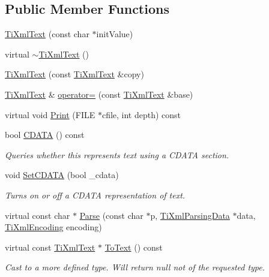 \subsection*{Public Member Functions}
\begin{DoxyCompactItemize}
\item 
\hyperlink{class_ti_xml_text_af659e77c6b87d684827f35a8f4895960}{Ti\+Xml\+Text} (const char $\ast$init\+Value)
\item 
virtual \hyperlink{class_ti_xml_text_a829a4bd2d8d2461c333eb4f3f5b1b3d2}{$\sim$\+Ti\+Xml\+Text} ()
\item 
\hyperlink{class_ti_xml_text_a8d2cc1b4af2208cbb0171cf20f6815d1}{Ti\+Xml\+Text} (const \hyperlink{class_ti_xml_text}{Ti\+Xml\+Text} \&copy)
\item 
\hyperlink{class_ti_xml_text}{Ti\+Xml\+Text} \& \hyperlink{class_ti_xml_text_aed5b13f9c1b804c616fd533882c29f57}{operator=} (const \hyperlink{class_ti_xml_text}{Ti\+Xml\+Text} \&base)
\item 
virtual void \hyperlink{class_ti_xml_text_a75f6895906333894e2574cc8cf77ea79}{Print} (F\+I\+LE $\ast$cfile, int depth) const
\item 
bool \hyperlink{class_ti_xml_text_aac1f4764d220ed6bf809b16dfcb6b45a}{C\+D\+A\+TA} () const
\begin{DoxyCompactList}\small\item\em Queries whether this represents text using a C\+D\+A\+TA section. \end{DoxyCompactList}\item 
void \hyperlink{class_ti_xml_text_acb17ff7c5d09b2c839393445a3de5ea9}{Set\+C\+D\+A\+TA} (bool \+\_\+cdata)
\begin{DoxyCompactList}\small\item\em Turns on or off a C\+D\+A\+TA representation of text. \end{DoxyCompactList}\item 
virtual const char $\ast$ \hyperlink{class_ti_xml_text_a8d2dcfa41fc73d3e62dacc2fcf633819}{Parse} (const char $\ast$p, \hyperlink{class_ti_xml_parsing_data}{Ti\+Xml\+Parsing\+Data} $\ast$data, \hyperlink{tinyxml_8h_a88d51847a13ee0f4b4d320d03d2c4d96}{Ti\+Xml\+Encoding} encoding)
\item 
virtual const \hyperlink{class_ti_xml_text}{Ti\+Xml\+Text} $\ast$ \hyperlink{class_ti_xml_text_af8973cfd4ca00c5d934cb23e8aa0f5d5}{To\+Text} () const
\begin{DoxyCompactList}\small\item\em Cast to a more defined type. Will return null not of the requested type. \end{DoxyCompactList}\item 

\end{DoxyCompactItemize}
